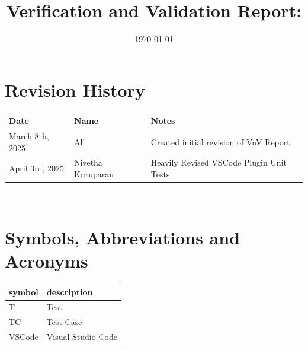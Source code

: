 \documentclass[12pt, titlepage]{article}
\begin{document}
\title{Verification and Validation Report: \progname}
\author{\authname}
\date{\today}

\maketitle


\section*{Revision History}

\begin{tabularx}{\textwidth}{p{4cm}p{4cm}X}
  \toprule {\bf Date} & {\bf Name} & {\bf Notes}\\
  \midrule
  March 8th, 2025 & All & Created initial revision of VnV Report\\
  April 3rd, 2025 & Nivetha Kuruparan & Heavily Revised VSCode Plugin Unit Tests\\
  \bottomrule
\end{tabularx}

~\newpage

\section*{Symbols, Abbreviations and Acronyms}

\renewcommand{\arraystretch}{1.2}
\begin{tabular}{l l}
  \toprule
  \textbf{symbol} & \textbf{description}\\
  \midrule
  T & Test\\
  TC & Test Case\\
  VSCode & Visual Studio Code\\
  \bottomrule
\end{tabular}\\


\newpage

\tableofcontents

\listoftables %

\listoffigures %

\newpage


\newcommand{\SRS}{\href{https://github.com/ssm-lab/capstone--source-code-optimizer/blob/main/docs/SRS/SRS.pdf}{SRS}}
\newcommand{\VnVPlan}{\href{https://github.com/ssm-lab/capstone--source-code-optimizer/blob/main/docs/VnVPlan/VnVPlan.pdf}{VnV Plan}}
\end{document}
